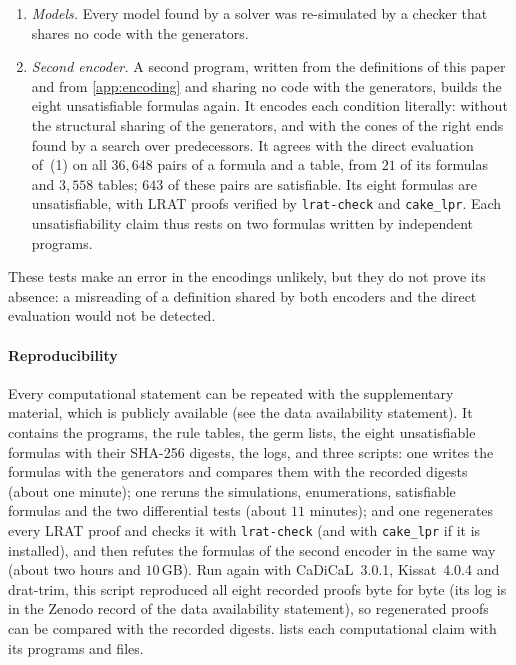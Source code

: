 \begin{enumerate}[(1)]
no four-state rule synchronizes the lines of lengths $2,\dots,9$. The germ
enumeration of \cref{prop:germs} and the refutations of its $14$ remaining
germs were each repeated by an independent program.
\item \emph{Models.} Every model found by a solver was re-simulated by a checker
that shares no code with the generators.
\item \emph{Second encoder.} A second program, written from the definitions of
this paper and from \cref{app:encoding} and sharing no code with the generators,
builds the eight unsatisfiable formulas again. It encodes each condition
literally: without the structural sharing of the generators, and with the cones
of the right ends found by a search over predecessors. It agrees with the direct
evaluation of~(1) on all $36{,}648$ pairs of a formula and a table, from $21$
of its formulas and $3{,}558$ tables; $643$ of these pairs are satisfiable. Its
eight formulas are unsatisfiable, with LRAT proofs verified by
\texttt{lrat-check} and \texttt{cake\_lpr}. Each
unsatisfiability claim thus rests on two formulas written by independent
programs.
\end{enumerate}
These tests make an error in the encodings unlikely, but they do not prove its
absence: a misreading of a definition shared by both encoders and the direct
evaluation would not be detected.

\begin{table}[t]
\centering\small
\caption{Known rules fixed in the formulas (\cref{sec:method}, check~(2)): the
outcome is predicted by simulating the rule. The formula for all $n\ge15$ uses
the representative lengths of \cref{cor:reduce}.}
\label{tab:validation}

\end{table}

\paragraph{Reproducibility}
Every computational statement can be repeated with the supplementary material,
which is publicly available (see the data availability statement). It contains
the programs, the rule tables, the germ lists, the eight unsatisfiable formulas
with their SHA-256 digests, the logs, and three scripts: one writes the
formulas with the generators and compares them with the recorded digests
(about one minute); one reruns the simulations, enumerations, satisfiable
formulas and the two differential tests (about $11$ minutes); and one
regenerates every LRAT proof and checks it with \texttt{lrat-check} (and with
\texttt{cake\_lpr} if it is installed), and then
refutes the formulas of the second encoder in the same way (about two hours and
$10$\,GB). Run again with CaDiCaL~3.0.1, Kissat~4.0.4 and \textsf{drat-trim},
this script reproduced all eight recorded proofs byte for byte (its log is in
the Zenodo record of the data availability statement), so regenerated proofs
can be compared with the recorded digests.
 lists each computational claim with its programs and files.

